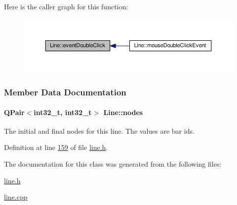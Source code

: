 Here is the caller graph for this function\+:
\nopagebreak
\begin{figure}[H]
\begin{center}
\leavevmode
\includegraphics[width=350pt]{class_line_a2444b577ea2254994599c6f829c629a5_icgraph}
\end{center}
\end{figure}




\subsubsection{Member Data Documentation}
\hypertarget{class_line_afd17c40d656e6a8d677cb22df5f0c70b}{}
\paragraph[{nodes}]{\setlength{\rightskip}{0pt plus 5cm}Q\+Pair$<$int32\+\_\+t, int32\+\_\+t$>$ Line\+::nodes}\label{class_line_afd17c40d656e6a8d677cb22df5f0c70b}
The initial and final nodes for this line. The values are bar ids. 

Definition at line \hyperlink{line_8h_source_l00159}{159} of file \hyperlink{line_8h_source}{line.\+h}.



The documentation for this class was generated from the following files\+:\begin{DoxyCompactItemize}
\item 
\hyperlink{line_8h}{line.\+h}\item 
\hyperlink{line_8cpp}{line.\+cpp}\end{DoxyCompactItemize}
